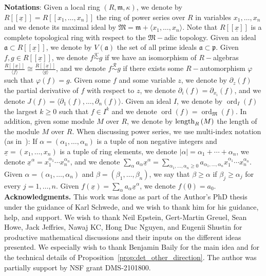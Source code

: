 \documentclass{article}
\DeclareMathOperator{\ord}{ord}
\newcommand{\equivr}{\overset{\mathcal{R}}{\sim}}
\newcommand{\equivk}{\overset{\mathcal{K}}{\sim}}
\numberwithin{theorem}{section}
\begin{document}
\noindent\textbf{Notations}: Given a local ring $(R, \mathfrak{m}, \kappa)$, we denote by $R[[\underline{x}]]=R[[x_1, \dots, x_n]]$ the ring of power series over $R$ in variables $x_1, \dots, x_n$ and we denote its maximal ideal by $\mathfrak{M}=\mathfrak{m}+\langle x_1, \dots, x_n \rangle$. Note that $R[[\underline{x}]]$ is a complete topological ring with respect to the $\mathfrak{M}-$adic topology.  Given an ideal $\mathfrak{a} \subset R[[\underline{x}]]$, we denote by $V(\mathfrak{a})$ the set of all prime ideals $\mathfrak{a} \subset \mathfrak{p}$. Given $f,g \in R[[\underline{x}]]$, we denote $f \equivk g$ if we have an isomorphism of $R-$algebras $\frac{R[[\underline{x}]]}{\langle f \rangle} \cong \frac{R[[\underline{x}]]}{\langle g \rangle}$, and we denote $f \equivr g$ if there exists some $R-$automorphism $\varphi$ such that $\varphi(f)=g$. Given some $f$ and some variable $z$, we denote by $\partial_z(f)$ the partial derivative of $f$ with respect to $z$, we denote $\partial_i(f)=\partial_{x_i}(f)$, and we denote $J(f) = \langle \partial_1(f), \dots, \partial_n(f) \rangle$. Given an ideal $I$, we denote by $\ord_I(f)$ the largest $k \geq 0$ such that $f \in I^k$ and we denote $\ord(f)=\ord_\mathfrak{M}(f)$. In addition, given some module $M$ over $R$, we denote by $\textup{length}_{R}\left(M\right)$ the length of the module $M$ over $R$. When discussing power series, we use multi-index notation (as in~\cite{greuel2007introduction}): If $\alpha = (\alpha_1, \dots, \alpha_n)$ is a tuple of non negative integers and $\underline{x}=(x_1, \dots, x_n)$ is a tuple of ring elements, we denote $|\alpha|=\alpha_1+\cdots +\alpha_n$, we denote $\underline{x}^\alpha =  x_1^{\alpha_1} \cdots x_n^{\alpha_n}$, and we denote $\sum_{\alpha} a_{\alpha} \underline{x}^{\alpha} = \sum_{\alpha_1, \dots, \alpha_n \geq 0} a_{\alpha_1, \dots, \alpha_n} x_1^{\alpha_1} \cdots x_n^{\alpha_n}$. Given $\alpha=(\alpha_1, \dots, \alpha_n)$ and $\beta=(\beta_1, \dots, \beta_n)$, we say that $\beta \geq \alpha$ if $\beta_j \geq \alpha_j$ for every $j=1, \dots, n$. Given $f(\underline{x}) = \sum_\alpha a_\alpha \underline{x}^\alpha$, we denote $f(\underline{0})=a_0$.\\


\noindent\textbf{Acknowledgments.} This work was done as part of the Author's PhD thesis under the guidance of Karl Schwede, and we wish to thank him for his guidance, help, and support. We wish to thank Neil Epstein, Gert-Martin Greuel, Sean Howe, Jack Jeffries, Nawaj KC, Hong Duc Nguyen, and Eugenii Shustin for productive mathematical discussions and their inputs on the different ideas presented. We especially wish to thank Benjamin Baily for the main idea and for the technical details of Proposition~\ref{prop:det_other_direction}. The author was partially support by NSF grant DMS-2101800. 
\end{document}

